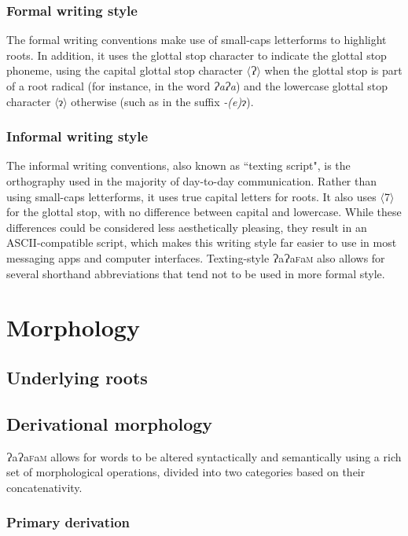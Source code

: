 \documentclass[a4paper,10pt,twoside,openright]{memoir}
\newcommand{\lang}{ɁaɁa\textsc{f}a\textsc{m}}
\newcommand{\sqbrack}[1]{$\langle$#1$\rangle$}
\newcommand{\bigglot}{Ɂ}
\newcommand{\lilglot}{ɂ}
\begin{document}
\subsection{Formal writing style}

The formal writing conventions make use of small-caps letterforms to highlight roots. In addition, it uses the glottal stop character to indicate the glottal stop phoneme, using the capital glottal stop character \sqbrack{\bigglot} when the glottal stop is part of a root radical (for instance, in the word \textit{\bigglot a\bigglot a}) and the lowercase glottal stop character \sqbrack{\lilglot} otherwise (such as in the suffix \textit{-(e)\lilglot}).

\subsection{Informal writing style}

The informal writing conventions, also known as ``texting script", is the orthography used in the majority of day-to-day communication. Rather than using small-caps letterforms, it uses true capital letters for roots. It also uses \sqbrack{7} for the glottal stop, with no difference between capital and lowercase. While these differences could be considered less aesthetically pleasing, they result in an ASCII-compatible script, which makes this writing style far easier to use in most messaging apps and computer interfaces. Texting-style \lang{} also allows for several shorthand abbreviations that tend not to be used in more formal style.

\chapter{Morphology}
\section{Underlying roots}
\section{Derivational morphology}

\lang{} allows for words to be altered syntactically and semantically using a rich set of morphological operations, divided into two categories based on their concatenativity. 

\subsection{Primary derivation}
\end{document}
